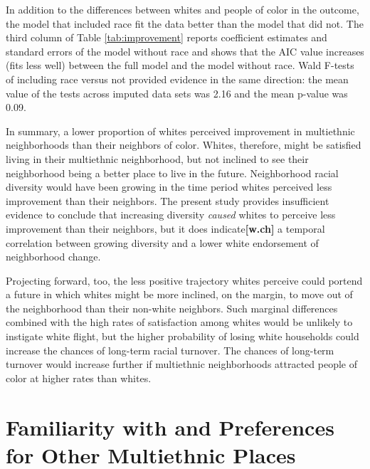 \documentclass[]{article}
\theoremstyle{definition}
\theoremstyle{definition}
\theoremstyle{definition}
\theoremstyle{remark}
\begin{document}
In addition to the differences between whites and people of color in the
outcome, the model that included race fit the data better than the model
that did not. The third column of Table \ref{tab:improvement} reports
coefficient estimates and standard errors of the model without race and
shows that the AIC value increases (fits less well) between the full
model and the model without race. Wald F-tests of including race versus
not provided evidence in the same direction: the mean value of the tests
across imputed data sets was 2.16 and the mean p-value was 0.09.

In summary, a lower proportion of whites perceived improvement in
multiethnic neighborhoods than their neighbors of color. Whites,
therefore, might be satisfied living in their multiethnic neighborhood,
but not inclined to see their neighborhood being a better place to live
in the future. Neighborhood racial diversity would have been growing in
the time period whites perceived less improvement than their neighbors.
The present study provides insufficient evidence to conclude that
increasing diversity \emph{caused} whites to perceive less improvement
than their neighbors, but it does indicate\textbf{{[}w.ch{]}} a temporal
correlation between growing diversity and a lower white endorsement of
neighborhood change.

Projecting forward, too, the less positive trajectory whites perceive
could portend a future in which whites might be more inclined, on the
margin, to move out of the neighborhood than their non-white neighbors.
Such marginal differences combined with the high rates of satisfaction
among whites would be unlikely to instigate white flight, but the higher
probability of losing white households could increase the chances of
long-term racial turnover. The chances of long-term turnover would
increase further if multiethnic neighborhoods attracted people of color
at higher rates than whites.


\singlespacing
\section{Familiarity with and Preferences for Other Multiethnic
Places}\label{familiarity-with-and-preferences-for-other-multiethnic-places}
\end{document}
